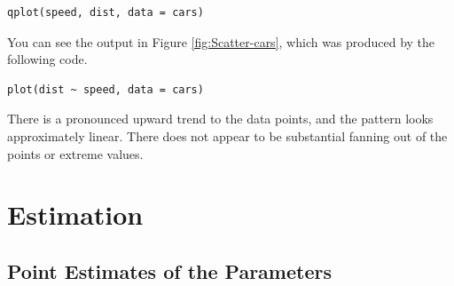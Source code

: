 \documentclass[captions=tableheading]{scrbook}
\begin{document}
\begin{example}
\begin{verbatim}
qplot(speed, dist, data = cars)
\end{verbatim}

You can see the output in Figure \ref{fig:Scatter-cars}, which was produced by the following code.


\begin{verbatim}
plot(dist ~ speed, data = cars)
\end{verbatim}

There is a pronounced upward trend to the data points, and the pattern looks approximately linear. There does not appear to be substantial fanning out of the points or extreme values. 
\end{example}
\section{Estimation}
\label{sec-11-2}

\label{sec:SLR-Estimation}
\subsection{Point Estimates of the Parameters}
\label{sec-11-2-1}

\label{sub:point-estimate-mle-slr}
\end{document}
